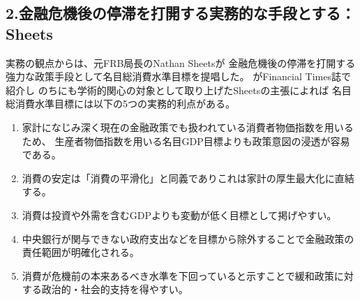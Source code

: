 \subsection{2.金融危機後の停滞を打開する実務的な手段とする：Sheets}
\label{sec:review_sheets}
実務の観点からは、元FRB局長のNathan Sheetsが
金融危機後の停滞を打開する強力な政策手段として名目総消費水準目標を提唱した\parencite{Harding2011}。
\textcite{Harding2011}がFinancial Times誌で紹介し
のちに\textcite{Chen2019}も学術的関心の対象として取り上げたSheetsの主張によれば
名目総消費水準目標には以下の5つの実務的利点がある。

\begin{enumerate}
  \item[(i)]家計になじみ深く現在の金融政策でも扱われている消費者物価指数を用いるため、
  生産者物価指数を用いる名目GDP目標よりも政策意図の浸透が容易である。
  \item[(ii)]消費の安定は「消費の平滑化」と同義でありこれは家計の厚生最大化に直結する。
  \item[(iii)]消費は投資や外需を含むGDPよりも変動が低く目標として掲げやすい。
  \item[(iv)]中央銀行が関与できない政府支出などを目標から除外することで金融政策の責任範囲が明確化される。
  \item[(v)]消費が危機前の本来あるべき水準を下回っていると示すことで緩和政策に対する政治的・社会的支持を得やすい。
\end{enumerate}


